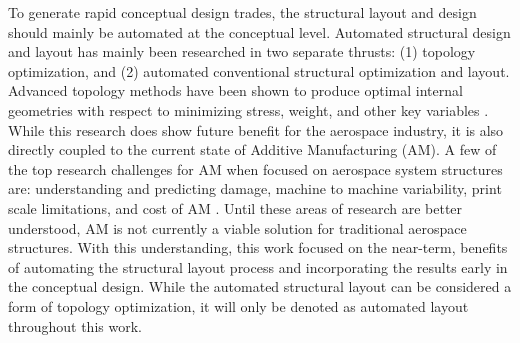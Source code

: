 \documentclass[conf]{new-aiaa}
\begin{document}
To generate rapid conceptual design trades, the structural layout 
and design should mainly be automated at the conceptual level. 
Automated structural design and layout has mainly been researched in 
two separate thrusts: 
(1) topology optimization, and  
(2) automated conventional structural optimization and layout. 
Advanced topology methods have been shown to produce optimal internal 
geometries with respect to minimizing stress, weight, and 
other key variables 
\cite{saitao_survey_of_structural_opt_2005,
      brampton_level_set_topology_optimisation_of_aircraft_wing_consdiring}.
While this research does show future benefit for the aerospace 
industry, it is also directly coupled to the current state of 
Additive Manufacturing (AM). 
A few of the top research challenges for AM when focused on aerospace 
system structures are:
understanding and predicting damage, machine to machine variability, 
print scale limitations, and cost of AM
\cite{ frazier_metal_additive_manufacturing_a_review,
       uriondo_the_present_and_future_of_AM_in_aerospace,
       wong_a_review_of_additive_manufacturing}.
Until these areas of research are better understood, 
AM is not currently a viable solution for traditional aerospace structures. 
With this understanding, this work focused on the near-term, 
benefits of automating the structural layout process and 
incorporating the results early in the conceptual design. 
While the automated structural layout can be considered a form of 
topology optimization, it will only be denoted as 
automated layout throughout this work.
\end{document}
